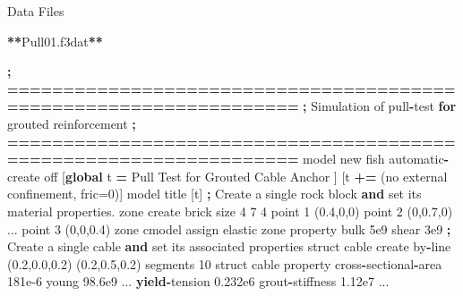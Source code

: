 \documentclass[a4paper, nobind]{templates/ociamthesis}
\newenvironment{Shaded}{\begin{snugshade}}{\end{snugshade}}
\newcommand{\BuiltInTok}[1]{#1}
\newcommand{\ControlFlowTok}[1]{\textcolor[rgb]{0.13,0.29,0.53}{\textbf{#1}}}
\newcommand{\DecValTok}[1]{\textcolor[rgb]{0.00,0.00,0.81}{#1}}
\newcommand{\FloatTok}[1]{\textcolor[rgb]{0.00,0.00,0.81}{#1}}
\newcommand{\KeywordTok}[1]{\textcolor[rgb]{0.13,0.29,0.53}{\textbf{#1}}}
\newcommand{\NormalTok}[1]{#1}
\newcommand{\OperatorTok}[1]{\textcolor[rgb]{0.81,0.36,0.00}{\textbf{#1}}}
\newcommand{\StringTok}[1]{\textcolor[rgb]{0.31,0.60,0.02}{#1}}
\renewenvironment{Shaded}
{
  \vspace{10pt}%
  \begin{snugshade}%
}{%
  \end{snugshade}%
  \vspace{8pt}%
}
\begin{document}
\begin{Shaded}
\begin{Highlighting}[]
\NormalTok{Data Files}

\OperatorTok{**}\NormalTok{Pull01.f3dat}\OperatorTok{**}

    \OperatorTok{;} \OperatorTok{==================================================================}
    \OperatorTok{;}\NormalTok{   Simulation of pull}\OperatorTok{{-}}\NormalTok{test }\ControlFlowTok{for}\NormalTok{ grouted reinforcement}
    \OperatorTok{;} \OperatorTok{==================================================================}
\NormalTok{    model new}
\NormalTok{    fish automatic}\OperatorTok{{-}}\NormalTok{create off}
\NormalTok{    [}\KeywordTok{global}\NormalTok{ t }\OperatorTok{=}  \StringTok{\textquotesingle{}Pull Test for Grouted Cable Anchor \textquotesingle{}}\NormalTok{]}
\NormalTok{    [t }\OperatorTok{+=} \StringTok{\textquotesingle{}(no external confinement, fric=0)\textquotesingle{}}\NormalTok{]}
\NormalTok{    model title [t]}
    \OperatorTok{;}\NormalTok{ Create a single rock block }\KeywordTok{and} \BuiltInTok{set}\NormalTok{ its material properties.}
\NormalTok{    zone create brick size }\DecValTok{4} \DecValTok{7} \DecValTok{4}\NormalTok{ point }\DecValTok{1}\NormalTok{ (}\FloatTok{0.4}\NormalTok{,}\DecValTok{0}\NormalTok{,}\DecValTok{0}\NormalTok{) point }\DecValTok{2}\NormalTok{ (}\DecValTok{0}\NormalTok{,}\FloatTok{0.7}\NormalTok{,}\DecValTok{0}\NormalTok{) ...}
\NormalTok{                                 point }\DecValTok{3}\NormalTok{ (}\DecValTok{0}\NormalTok{,}\DecValTok{0}\NormalTok{,}\FloatTok{0.4}\NormalTok{)}
\NormalTok{    zone cmodel assign elastic}
\NormalTok{    zone }\BuiltInTok{property}\NormalTok{ bulk }\FloatTok{5e9}\NormalTok{ shear }\FloatTok{3e9}
    \OperatorTok{;}\NormalTok{ Create a single cable }\KeywordTok{and} \BuiltInTok{set}\NormalTok{ its associated properties}
\NormalTok{    struct cable create by}\OperatorTok{{-}}\NormalTok{line (}\FloatTok{0.2}\NormalTok{,}\FloatTok{0.0}\NormalTok{,}\FloatTok{0.2}\NormalTok{) (}\FloatTok{0.2}\NormalTok{,}\FloatTok{0.5}\NormalTok{,}\FloatTok{0.2}\NormalTok{) segments }\DecValTok{10}
\NormalTok{    struct cable }\BuiltInTok{property}\NormalTok{ cross}\OperatorTok{{-}}\NormalTok{sectional}\OperatorTok{{-}}\NormalTok{area }\FloatTok{181e{-}6}\NormalTok{ young }\FloatTok{98.6e9}\NormalTok{ ...}
                          \ControlFlowTok{yield}\OperatorTok{{-}}\NormalTok{tension }\FloatTok{0.232e6}\NormalTok{ grout}\OperatorTok{{-}}\NormalTok{stiffness }\FloatTok{1.12e7}\NormalTok{ ...}

\end{Highlighting}
\end{Shaded}
\end{document}
